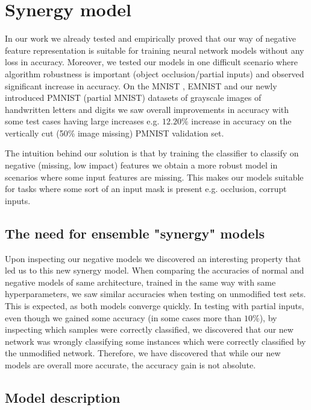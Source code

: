 \documentclass[b5paper]{book}
\let\cite\parencite
\begin{document}
\chapter{Synergy model}

In our work we already tested and empirically proved that our way of negative feature representation is suitable for training neural network models without any loss in accuracy. Moreover, we tested our models in one difficult scenario where algorithm robustness is important (object occlusion/partial inputs) and observed significant increase in accuracy. On the MNIST \cite{lecun1998mnist}, EMNIST \cite{cohen2017emnist} and our newly introduced PMNIST (partial MNIST) datasets of grayscale images of handwritten letters and digits we saw overall improvements in accuracy with some test cases having large increases e.g. \( 12.20\% \) increase in accuracy on the vertically cut (50\% image missing) PMNIST validation set. 

The intuition behind our solution is that by training the classifier to classify on negative (missing, low impact) features we obtain a more robust model in scenarios where some input features are missing. This makes our models suitable for tasks where some sort of an input mask is present e.g. occlusion, corrupt inputs.

\section{The need for ensemble "synergy" models}

Upon inspecting our negative models we discovered an interesting property that led us to this new synergy model. When comparing the accuracies of normal and negative models of same architecture, trained in the same way with same hyperparameters, we saw similar accuracies when testing on unmodified test sets. This is expected, as both models converge quickly. In testing with partial inputs, even though we gained some accuracy (in some cases more than \(10\%\)), by inspecting which samples were correctly classified, we discovered that our new network was wrongly classifying some instances which were correctly classified by the unmodified network. Therefore, we have discovered that while our new models are overall more accurate, the accuracy gain is not absolute.

\section{Model description}
\label{model}
\end{document}
